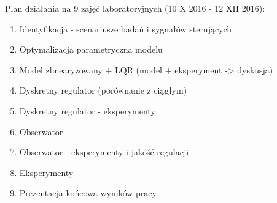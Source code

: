 Plan działania na 9 zajęć laboratoryjnych (10 X 2016 - 12 XII 2016): \\

\begin{enumerate}
\item Identyfikacja - scenariusze badań i sygnałów sterujących 
\item Optymalizacja parametryczna modelu
\item Model zlinearyzowany + LQR (model + eksperyment -> dyskusja)
\item Dyskretny regulator (porównanie z ciągłym)
\item Dyskretny regulator - eksperymenty
\item Obserwator
\item Obserwator - eksperymenty i jakość regulacji
\item Eksperymenty
\item Prezentacja końcowa wyników pracy
\end{enumerate}
